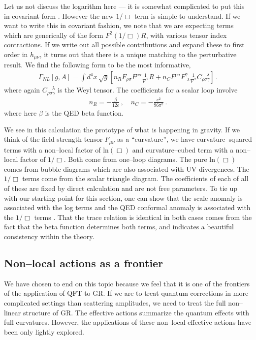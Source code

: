 \documentclass[11pt,a4paper]{article}
\begin{document}
Let us not discuss the logarithm here --- it is somewhat complicated to put this in covariant form \cite{Donoghue:2015xla, Donoghue:2015nba}. However the new $1/\Box$ term is simple to understand. If we want to write this in covariant fashion, we note that we are expecting terms which are generically of the form $F^2 (1/\Box)R$, with various tensor index contractions. If we write out all possible contributions and expand these to first order in $h_{\mu\nu}$, it turns out that there is a unique matching to the perturbative result.
We find the following form to be the most informative,
\begin{align}
\Gamma_{NL}[g,A] = \int d^4x \, \sqrt{g} \left[n_R F_{\rho\sigma}F^{\rho\sigma}\frac{1}{\nabla^2} R  + n_C F^{\rho\sigma} F^{\gamma}_{\, \, \lambda} \frac{1}{\nabla^2}C_{\rho\sigma\gamma}^{\quad \lambda} \right]  \,.
\label{nonlinearcompletion}
\end{align}
where again $C_{\rho\sigma\gamma}^{\quad \lambda} $ is the Weyl tensor. The coefficients for a scalar loop involve
\begin{align}
n_R = - \frac{\beta}{12 e} \,, \quad n_C =  - \frac{e^2}{96 \pi^2} \,.
\end{align}
where here $\beta$ is the QED beta function.

We see in this calculation the prototype of what is happening in gravity. If we think of the field strength tensor $F_{\mu\nu}$ as a ``curvature'', we have curvature--squared terms with a non--local factor of $\text{ln}(\Box)$ and curvature--cubed term with a non--local factor of $1/\Box$. Both come from one--loop diagrams. The pure $\text{ln}( \Box)$ comes from bubble diagrams which are also associated with UV divergences. The
$1/\Box$ terms come from the scalar triangle diagram. The coefficients of each of all of these are fixed by direct calculation and are not free parameters. To tie up with our starting point for this section, one can show that the scale anomaly is associated with the log terms and the QED conformal anomaly is associated with the $1/\Box$ terms \cite{Donoghue:2015xla}. That the trace relation is identical in both cases comes from the fact that the beta function determines both terms, and indicates a beautiful consistency within the theory.

\subsection{Non--local actions as a frontier}

We have chosen to end on this topic because we feel that it is one of the frontiers of the application of QFT to GR. If we are to treat quantum corrections in more complicated settings than scattering amplitudes, we need to treat the full non--linear structure of GR. The effective actions summarize the quantum effects with full curvatures. However, the applications of these non--local effective actions have been only lightly explored.
\end{document}
